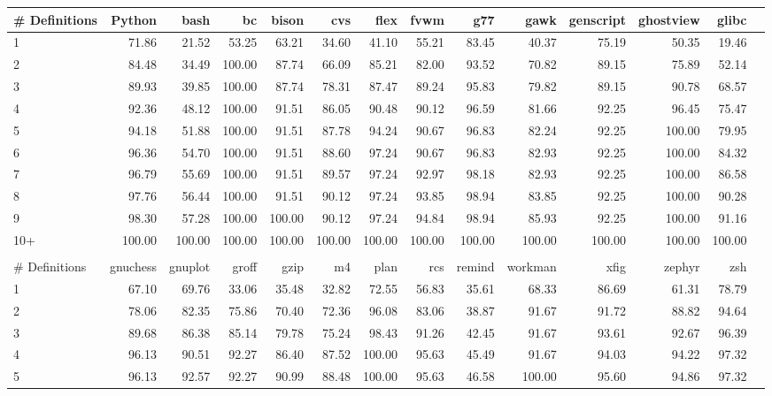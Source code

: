 \begin{tabular}{|l|r|r|r|r|r|r|r|r|r|r|r|r|r|}\hline
\# Definitions & Python & bash & bc & bison & cvs & flex & fvwm & g77 & gawk & genscript & ghostview & glibc\\\hline
1 & 71.86 & 21.52 & 53.25 & 63.21 & 34.60 & 41.10 & 55.21 & 83.45 & 40.37 & 75.19 & 50.35 & 19.46\\\hline
2 & 84.48 & 34.49 & 100.00 & 87.74 & 66.09 & 85.21 & 82.00 & 93.52 & 70.82 & 89.15 & 75.89 & 52.14\\\hline
3 & 89.93 & 39.85 & 100.00 & 87.74 & 78.31 & 87.47 & 89.24 & 95.83 & 79.82 & 89.15 & 90.78 & 68.57\\\hline
4 & 92.36 & 48.12 & 100.00 & 91.51 & 86.05 & 90.48 & 90.12 & 96.59 & 81.66 & 92.25 & 96.45 & 75.47\\\hline
5 & 94.18 & 51.88 & 100.00 & 91.51 & 87.78 & 94.24 & 90.67 & 96.83 & 82.24 & 92.25 & 100.00 & 79.95\\\hline
6 & 96.36 & 54.70 & 100.00 & 91.51 & 88.60 & 97.24 & 90.67 & 96.83 & 82.93 & 92.25 & 100.00 & 84.32\\\hline
7 & 96.79 & 55.69 & 100.00 & 91.51 & 89.57 & 97.24 & 92.97 & 98.18 & 82.93 & 92.25 & 100.00 & 86.58\\\hline
8 & 97.76 & 56.44 & 100.00 & 91.51 & 90.12 & 97.24 & 93.85 & 98.94 & 83.85 & 92.25 & 100.00 & 90.28\\\hline
9 & 98.30 & 57.28 & 100.00 & 100.00 & 90.12 & 97.24 & 94.84 & 98.94 & 85.93 & 92.25 & 100.00 & 91.16\\\hline
10+ & 100.00 & 100.00 & 100.00 & 100.00 & 100.00 & 100.00 & 100.00 & 100.00 & 100.00 & 100.00 & 100.00 & 100.00\\\hline
\multicolumn{12}{c}{} \\
\hline
\# Definitions & gnuchess & gnuplot & groff & gzip & m4 & plan & rcs & remind & workman & xfig & zephyr & zsh\\\hline
1 & 67.10 & 69.76 & 33.06 & 35.48 & 32.82 & 72.55 & 56.83 & 35.61 & 68.33 & 86.69 & 61.31 & 78.79\\\hline
2 & 78.06 & 82.35 & 75.86 & 70.40 & 72.36 & 96.08 & 83.06 & 38.87 & 91.67 & 91.72 & 88.82 & 94.64\\\hline
3 & 89.68 & 86.38 & 85.14 & 79.78 & 75.24 & 98.43 & 91.26 & 42.45 & 91.67 & 93.61 & 92.67 & 96.39\\\hline
4 & 96.13 & 90.51 & 92.27 & 86.40 & 87.52 & 100.00 & 95.63 & 45.49 & 91.67 & 94.03 & 94.22 & 97.32\\\hline
5 & 96.13 & 92.57 & 92.27 & 90.99 & 88.48 & 100.00 & 95.63 & 46.58 & 100.00 & 95.60 & 94.86 & 97.32\\\hline

\end{tabular}
